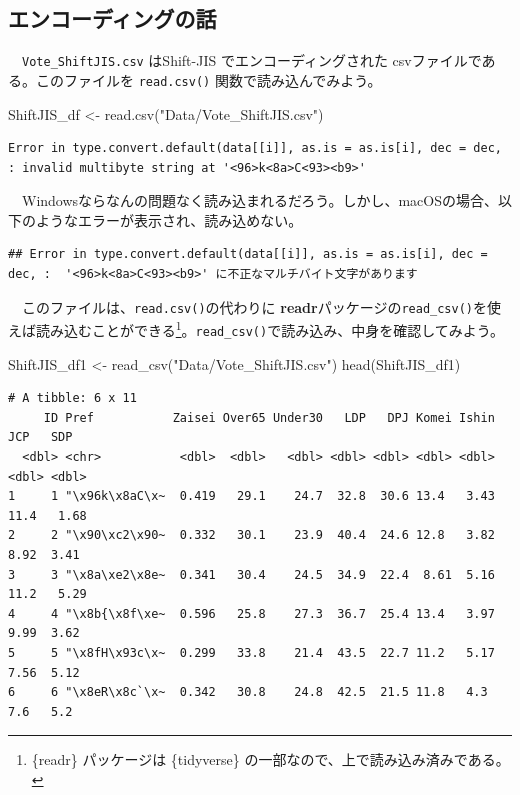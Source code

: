 \documentclass[
  a4paper,
  pandoc,
  ja=standard,
  jafont=haranoaji]{bxjsbook}
\newenvironment{Shaded}{\begin{snugshade}}{\end{snugshade}}
\newcommand{\FunctionTok}[1]{\textcolor[rgb]{0.28,0.35,0.67}{#1}}
\newcommand{\NormalTok}[1]{\textcolor[rgb]{0.00,0.48,0.65}{#1}}
\newcommand{\OtherTok}[1]{\textcolor[rgb]{0.00,0.48,0.65}{#1}}
\newcommand{\StringTok}[1]{\textcolor[rgb]{0.13,0.47,0.30}{#1}}
\begin{document}
\hypertarget{ux30a8ux30f3ux30b3ux30fcux30c7ux30a3ux30f3ux30b0ux306eux8a71}{%
\subsection{エンコーディングの話}\label{ux30a8ux30f3ux30b3ux30fcux30c7ux30a3ux30f3ux30b0ux306eux8a71}}

　\texttt{Vote\_ShiftJIS.csv} はShift-JIS でエンコーディングされた
csvファイルである。このファイルを \texttt{read.csv()}
関数で読み込んでみよう。

\begin{Shaded}
\begin{Highlighting}[numbers=left,,]
\NormalTok{ShiftJIS\_df }\OtherTok{\textless{}{-}} \FunctionTok{read.csv}\NormalTok{(}\StringTok{"Data/Vote\_ShiftJIS.csv"}\NormalTok{)}
\end{Highlighting}
\end{Shaded}

\begin{verbatim}
Error in type.convert.default(data[[i]], as.is = as.is[i], dec = dec, : invalid multibyte string at '<96>k<8a>C<93><b9>'
\end{verbatim}

　Windowsならなんの問題なく読み込まれるだろう。しかし、macOSの場合、以下のようなエラーが表示され、読み込めない。

\begin{verbatim}
## Error in type.convert.default(data[[i]], as.is = as.is[i], dec = dec, :  '<96>k<8a>C<93><b9>' に不正なマルチバイト文字があります
\end{verbatim}

　このファイルは、\texttt{read.csv()}の代わりに
\textbf{readr}パッケージの\texttt{read\_csv()}を使えば読み込むことができる\footnote{\{readr\}
  パッケージは \{tidyverse\} の一部なので、上で読み込み済みである。}。\texttt{read\_csv()}で読み込み、中身を確認してみよう。

\begin{Shaded}
\begin{Highlighting}[numbers=left,,]
\NormalTok{ShiftJIS\_df1 }\OtherTok{\textless{}{-}} \FunctionTok{read\_csv}\NormalTok{(}\StringTok{"Data/Vote\_ShiftJIS.csv"}\NormalTok{)}
\FunctionTok{head}\NormalTok{(ShiftJIS\_df1)}
\end{Highlighting}
\end{Shaded}

\begin{verbatim}
# A tibble: 6 x 11
     ID Pref           Zaisei Over65 Under30   LDP   DPJ Komei Ishin   JCP   SDP
  <dbl> <chr>           <dbl>  <dbl>   <dbl> <dbl> <dbl> <dbl> <dbl> <dbl> <dbl>
1     1 "\x96k\x8aC\x~  0.419   29.1    24.7  32.8  30.6 13.4   3.43 11.4   1.68
2     2 "\x90\xc2\x90~  0.332   30.1    23.9  40.4  24.6 12.8   3.82  8.92  3.41
3     3 "\x8a\xe2\x8e~  0.341   30.4    24.5  34.9  22.4  8.61  5.16 11.2   5.29
4     4 "\x8b{\x8f\xe~  0.596   25.8    27.3  36.7  25.4 13.4   3.97  9.99  3.62
5     5 "\x8fH\x93c\x~  0.299   33.8    21.4  43.5  22.7 11.2   5.17  7.56  5.12
6     6 "\x8eR\x8c`\x~  0.342   30.8    24.8  42.5  21.5 11.8   4.3   7.6   5.2 
\end{verbatim}
\end{document}
